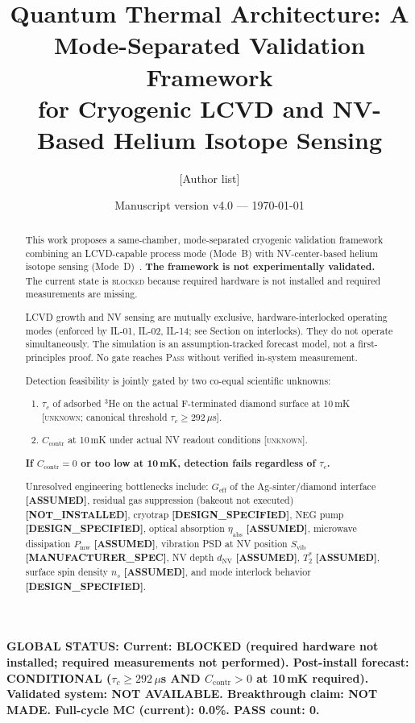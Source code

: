 \documentclass[12pt,a4paper]{article}
\title{\textbf{Quantum Thermal Architecture: A Mode-Separated Validation Framework\\
for Cryogenic LCVD and NV-Based Helium Isotope Sensing}}
\author{[Author list]}
\date{Manuscript version v4.0 --- \today}
\newcommand{\blocked}{\textsc{blocked}}
\newcommand{\unknown}{\textsc{unknown}}
\newcommand{\assumed}{\textbf{[ASSUMED]}}
\newcommand{\designspec}{\textbf{[DESIGN\_SPECIFIED]}}
\newcommand{\notinstalled}{\textbf{[NOT\_INSTALLED]}}
\newcommand{\mfrspec}{\textbf{[MANUFACTURER\_SPEC]}}
\newcommand{\verdictbox}[1]{%
  \vspace{0.5em}\par
  \noindent\colorbox{yellow!30}{\parbox{\dimexpr\linewidth-2\fboxsep}{\bfseries #1}}\par
  \vspace{0.5em}
}
\begin{document}
\maketitle

\verdictbox{GLOBAL STATUS:
Current: BLOCKED (required hardware not installed; required measurements not performed).
Post-install forecast: CONDITIONAL ($\tau_c \geq 292\,\mu$s AND $C_\mathrm{contr}>0$ at 10\,mK required).
Validated system: NOT AVAILABLE.
Breakthrough claim: NOT MADE.
Full-cycle MC (current): 0.0\%.
PASS count: 0.}

\begin{abstract}
This work proposes a same-chamber, mode-separated cryogenic validation framework
combining an LCVD-capable process mode (Mode~B) with NV-center-based helium
isotope sensing (Mode~D)~\cite{Pobell2007,DegenRMP2017}.
\textbf{The framework is not experimentally validated.}
The current state is \blocked{} because required hardware is not installed
and required measurements are missing.

LCVD growth and NV sensing are mutually exclusive, hardware-interlocked
operating modes (enforced by IL-01, IL-02, IL-14; see Section on interlocks).
They do not operate simultaneously.
The simulation is an assumption-tracked forecast model, not a first-principles proof.
No gate reaches \textsc{Pass} without verified in-system measurement.

Detection feasibility is jointly gated by two co-equal scientific unknowns:
\begin{enumerate}[noitemsep]
  \item $\tau_c$ of adsorbed $^3$He on the actual F-terminated diamond surface
        at 10\,mK \cite{Bernu2006,MorhardPRB1996} [\unknown{}; canonical threshold $\tau_c \geq 292\,\mu$s].
  \item $C_\mathrm{contr}$ at 10\,mK under actual NV readout conditions
        \cite{DegenRMP2017,Sangtawesin2019} [\unknown{}].
\end{enumerate}
\textbf{If $C_\mathrm{contr} = 0$ or too low at 10\,mK, detection fails
regardless of $\tau_c$.}

Unresolved engineering bottlenecks include: $G_\mathrm{eff}$ of the
Ag-sinter/diamond interface \assumed{}, residual gas suppression
(bakeout not executed) \notinstalled{}, cryotrap \designspec{},
NEG pump \designspec{}, optical absorption $\eta_\mathrm{abs}$ \assumed{},
microwave dissipation $P_\mathrm{mw}$ \assumed{},
vibration PSD at NV position $S_\mathrm{vib}$ \mfrspec{},
NV depth $d_\mathrm{NV}$ \assumed{}, $T_2^*$ \assumed{},
surface spin density $n_s$ \assumed{}, and mode interlock behavior \designspec{}.


\end{abstract}
\end{document}
